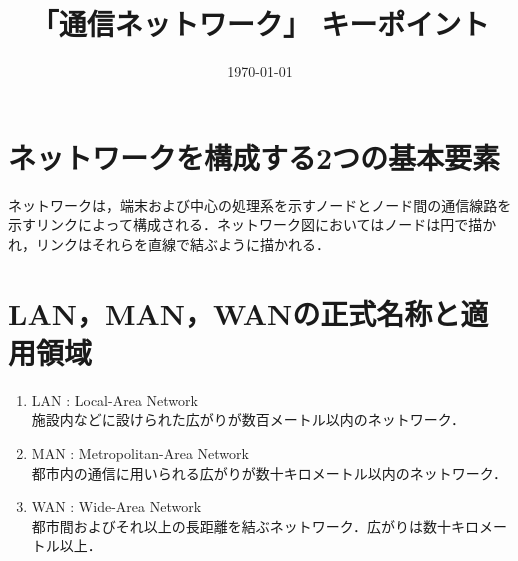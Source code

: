 \documentclass[10.5pt]{jsarticle}
\title{「通信ネットワーク」 キーポイント}
\date{\today}
\author{}
\begin{document}
\maketitle
\thispagestyle{fancy}

\section{ネットワークを構成する2つの基本要素}
ネットワークは，端末および中心の処理系を示すノードとノード間の通信線路を示すリンクによって構成される．ネットワーク図においてはノードは円で描かれ，リンクはそれらを直線で結ぶように描かれる．

\section{LAN，MAN，WANの正式名称と適用領域}
\begin{enumerate}
	\item{LAN : Local-Area Network}\\
		施設内などに設けられた広がりが数百メートル以内のネットワーク．
	\item{MAN : Metropolitan-Area Network}\\
		都市内の通信に用いられる広がりが数十キロメートル以内のネットワーク．
	\item{WAN : Wide-Area Network}\\
		都市間およびそれ以上の長距離を結ぶネットワーク．広がりは数十キロメートル以上．
\end{enumerate}
\end{document}
